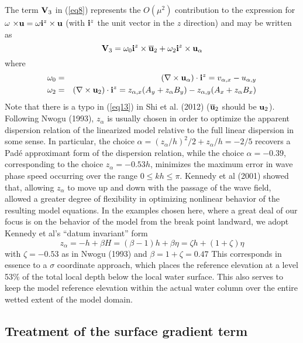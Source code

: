 \documentclass[11pt]{article}
\newcommand{\be}{\begin{equation}}
\newcommand{\ee}{\end{equation}}
\newcommand{\ba}{\begin{eqnarray}}
\newcommand{\ea}{\end{eqnarray}}
\begin{document}
The term ${\bf V}_3$ in (\ref{eq8}) represents the $O(\mu^2)$ contribution to the expression for {\boldmath$\omega$} $\times {\bf u} = \omega {\bf i}^z \times {\bf u}$ (with ${\bf i}^z$ the unit vector in the $z$ direction) and may be written as
\be
{\bf V}_3 = \omega_0 {\bf i}^z \times \overline{\bf u}_2 + \omega_2 {\bf i}^z  \times {\bf u}_\alpha \label{eq11}
\ee
where
\ba
\omega_0  & = &  (\nabla \times  {\bf u}_\alpha)\cdot{\bf i}^z  = v_{\alpha,x} - u_{\alpha,y}   \label{eq12} \\
\omega_2  & = &  (\nabla \times {\bf u}_2) \cdot {\bf i}^z = z_{\alpha,x} (A_y + z_\alpha B_y) - z_{\alpha,y} (A_x + z_\alpha B_x)  
 \label{eq13} 
\ea
Note that there is a typo in (\ref{eq13}) in Shi et al. (2012) ($\overline {\bf u}_2$ should be  ${\bf u}_2$). Following Nwogu (1993), $z_\alpha$ is usually chosen in order to optimize the apparent dispersion relation of the linearized model relative to the full linear dispersion in some sense.  In particular, the choice $\alpha = (z_\alpha / h)^2 /2 + z_\alpha / h = -2/5$ recovers a Pad\'{e} approximant form of the dispersion relation, while the choice $\alpha = -0.39$, corresponding to the choice $z_\alpha = -0.53 h$, minimizes the maximum error in wave phase speed occurring over the range $0 \leq kh \leq \pi$.  Kennedy et al (2001) showed that, allowing $z_\alpha$ to move up and down with the passage of the wave field,  allowed a greater degree of flexibility in optimizing nonlinear behavior of the resulting model equations.  In the examples chosen here, where a great deal of our focus is on the behavior of the model from the break point landward, we adopt Kennedy et al's ``datum invariant'' form
\be
z_\alpha = -h + \beta H = (\beta - 1) h + \beta \eta = \zeta h + (1+\zeta)\eta \label{eq14}
\ee
with $\zeta = -0.53$ as in Nwogu (1993) and $\beta = 1 + \zeta = 0.47$  This corresponds in essence to a $\sigma$ coordinate approach, which places the reference elevation at a level 53\% of the total local depth below the local water surface.  This also serves to keep the model reference elevation within the actual water column over the entire wetted extent of the model domain.

\subsection{Treatment of the surface gradient term}
\end{document}
